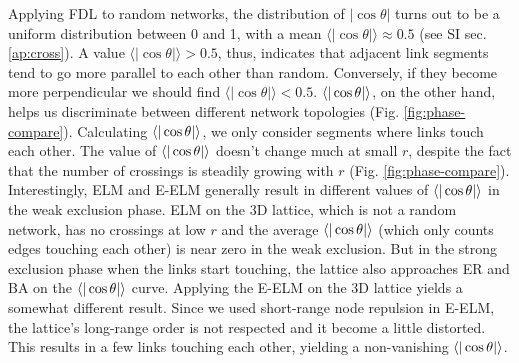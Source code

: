 \documentclass[nofootinbib,preprint,floatfix]{revtex4} %
\begin{document}
Applying FDL to random networks,  %
the distribution of $|\cos\theta |$ turns out to be a uniform distribution between 0 and 1, with a mean $\langle |\cos\theta |\rangle \approx 0.5$ (see SI sec. \ref{ap:cross}). 
A value $\langle |\cos\theta |\rangle > 0.5 $, thus, indicates that adjacent link segments tend to go more parallel to each other than random. 
Conversely, if they become more perpendicular we should find $\langle |\cos\theta |\rangle < 0.5 $. 
$\be{|\cos\theta|}$, on the other hand, helps us discriminate between different network topologies (Fig. \ref{fig:phase-compare}). 
Calculating $\be{|\cos\theta|}$, we only consider segments where links touch each other. 
The value of $\be{|\cos\theta|}$ doesn't change much at small $r$, despite the fact that the number of crossings is steadily growing with $r$ (Fig. \ref{fig:phase-compare}).
Interestingly, ELM and E-ELM  generally result in different values of $\be{|\cos\theta|}$ in the weak exclusion phase. 
ELM on the 3D lattice, which is not a random network, has no crossings at low $r$ and the average $\be{|\cos\theta|}$ (which only counts edges touching each other) is near zero in the weak exclusion. But in the strong exclusion phase when the links start touching, the lattice also approaches ER and BA on the $\be{|\cos\theta|}$ curve. 
Applying the E-ELM on the 3D lattice yields a somewhat different result. Since we used short-range node repulsion in E-ELM, the lattice's long-range order is not respected and it become a little distorted. This results in a few links touching each other, yielding a non-vanishing $\be{|\cos\theta|}$.
\end{document}
